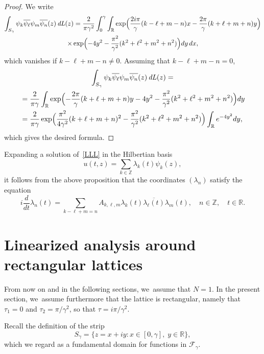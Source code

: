 \documentclass[10pt]{amsart}
\let\sep:
\DeclareMathOperator{\dL}{\mathit{dL}}
\theoremstyle{definition}
\let\e e
\let\EE\exp
\let\ov\overline
\newcommand\R{\mathbb R}
\newcommand\Z{\mathbb Z}
\begin{document}
\begin{proof} We write\vspace*{-3pt}
\begin{multline*}
\int_{S_{\gamma}} \psi_{k}\ov{\psi_{\ell}} \psi_{m}\ov{\psi_{n}}(z)\dL(z)
= \frac{2}{\pi \gamma^2}\int_{0}^{\gamma}\int_{\R}
\EE\Bigl(\frac{2i \pi}{\gamma}(k-\ell+m-n)x -\frac{2\pi}{\gamma}(k+\ell+m+n)y\Bigr)\\
\times \EE\Bigl(-4y^2-\frac{\pi^2}{\gamma^2}(k^2+\ell^2+m^2+n^2)\Bigr) dy \, dx,
\end{multline*}
which vanishes if $k-\ell+m-n \neq 0$. Assuming that $k-\ell+m-n =0$,\vspace*{-3pt}
\begin{multline*}
\int_{S_{\gamma}} \psi_{k}\ov{\psi_{\ell}} \psi_{m}\ov{\psi_{n}}(z)\dL(z)=\\
\begin{aligned}
&= \frac{2}{\pi \gamma} \int_{\R} \EE\Bigl(-\frac{2\pi}{\gamma}(k+\ell+m+n)y-4y^2-\frac{\pi^2}{\gamma^2}(k^2+\ell^2+m^2+n^2)\Bigr) dy\\
&= \frac{2}{\pi \gamma}\EE\Bigl(\frac{\pi^2}{4 \gamma^2}(k+\ell+m+n)^2-\frac{\pi^2}{\gamma^2}(k^2+\ell^2+m^2+n^2)\Bigr) \int_{\R} \e^{ -4y^2} dy,
\end{aligned}
\end{multline*}
which gives the desired formula.
\end{proof}

Expanding a solution of~\eqref{LLL} in the Hilbertian basis
\[
u(t,z) = \sum_{k \in \mathbb{Z}} \lambda_k(t) \psi_k(z),
\]
it follows from the above proposition that the coordinates $(\lambda_n)$ satisfy the equation
\begin{equation}\label{eq_lambda_k}
i\frac{d}{dt} \lambda_n(t) = \sum_{k - \ell + m = n} A_{k,\ell,m} \lambda_{k}(t) \ov{\lambda_{\ell}(t)} \lambda_{m}(t), \quad n \in \Z, \quad t\in \R.
\end{equation}
\setcounter{section}{3}
\section{Linearized analysis around rectangular lattices}\label{rectangular_lattice}
\label{section4}

From now on and in the following sections, we~assume that $N=1$. In the present section, we~assume furthermore that the lattice is rectangular, namely that $\tau_1=0$ and $\tau_2={ \pi}/{\gamma^2}$, so that $\tau= { i\pi}/{\gamma^2}$.

Recall the definition of the strip
\[
S_{\gamma}=\bigl\{z=x+iy\sep x\in[0,\gamma],\; y\in \R\bigr\},
\]
which we regard as a fundamental domain for functions in $\mathcal{F}_\gamma$.
\end{document}
